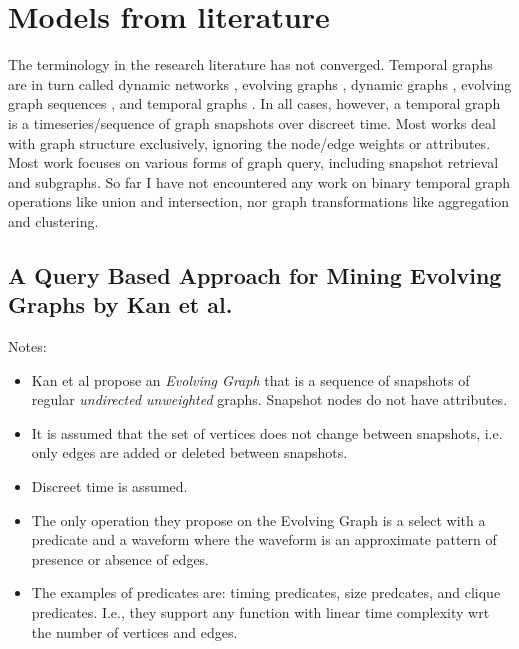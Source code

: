 \section{Models from literature}

The terminology in the research literature has not converged. Temporal graphs are in turn called dynamic networks \cite{Lerman2010,Jin2007,Lahiri2008}, evolving graphs \cite{Kan2009,Chan2008,Han2014,Aggarwal2010}, dynamic graphs \cite{Vaquero2014,Borgwardt2006}, evolving graph sequences \cite{Ren2011}, and temporal graphs \cite{Wu2014}.  In all cases, however, a temporal graph is a timeseries/sequence of graph snapshots over discreet time. Most works deal with graph structure exclusively, ignoring the node/edge weights or attributes. Most work focuses on various forms of graph query, including snapshot retrieval and subgraphs. So far I have not encountered any work on binary temporal graph operations like union and intersection, nor graph transformations like aggregation and clustering.

\subsection{A Query Based Approach for Mining Evolving Graphs by Kan et al. \cite{Kan2009}}

Notes:
\begin{itemize}

\item Kan et al propose an {\em Evolving Graph} that is a sequence of snapshots of regular {\em undirected unweighted} graphs. Snapshot nodes do not have attributes.
\item It is assumed that the set of vertices does not change between snapshots, i.e. only edges are added or deleted between snapshots.
\item Discreet time is assumed.
\item The only operation they propose on the Evolving Graph is a select with a predicate and a waveform where the waveform is an approximate pattern of presence or absence of edges.
\item The examples of predicates are: timing predicates, size predcates, and clique predicates. I.e., they support any function with linear time complexity wrt the number of vertices and edges.

\end{itemize}

